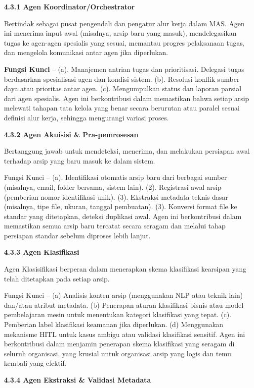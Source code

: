 \textbf{4.3.1 Agen Koordinator/Orchestrator}

Bertindak sebagai pusat pengendali dan pengatur alur kerja dalam MAS.
Agen ini menerima input awal (misalnya, arsip baru yang masuk),
mendelegasikan tugas ke agen-agen spesialis yang sesuai, memantau
progres pelaksanaan tugas, dan mengelola komunikasi antar agen jika
diperlukan.

\textbf{Fungsi Kunci} -- (a). Manajemen antrian tugas dan prioritisasi.
Delegasi tugas berdasarkan spesialisasi agen dan kondisi sistem. (b).
Resolusi konflik sumber daya atau prioritas antar agen. (c).
Mengumpulkan status dan laporan parsial dari agen spesialis. Agen ini
berkontribusi dalam memastikan bahwa setiap arsip melewati tahapan tata
kelola yang benar secara berurutan atau paralel sesuai definisi alur
kerja, sehingga mengurangi variasi proses.

\textbf{4.3.2 Agen Akuisisi \& Pra-pemrosesan}

Bertanggung jawab untuk mendeteksi, menerima, dan melakukan persiapan
awal terhadap arsip yang baru masuk ke dalam sistem.

Fungsi Kunci -- (a). Identifikasi otomatis arsip baru dari berbagai
sumber (misalnya, email, folder bersama, sistem lain). (2). Registrasi
awal arsip (pemberian nomor identifikasi unik). (3). Ekstraksi metadata
teknis dasar (misalnya, tipe file, ukuran, tanggal pembuatan). (3).
Konversi format file ke standar yang ditetapkan, deteksi duplikasi awal.
Agen ini berkontribusi dalam memastikan semua arsip baru tercatat secara
seragam dan melalui tahap persiapan standar sebelum diproses lebih
lanjut.

\textbf{4.3.3 Agen Klasifikasi}

Agen Klasisifikasi berperan dalam menerapkan skema klasifikasi kearsipan
yang telah ditetapkan pada setiap arsip.

Fungsi Kunci -- (a) Analisis konten arsip (menggunakan NLP atau teknik
lain) dan/atau atribut metadata. (b) Penerapan aturan klasifikasi bisnis
atau model pembelajaran mesin untuk menentukan kategori klasifikasi yang
tepat. (c). Pemberian label klasifikasi keamanan jika diperlukan. (d)
Menggunakan mekanisme HITL untuk kasus ambigu atau validasi klasifikasi
sensitif. Agen ini berkontribusi dalam menjamin penerapan skema
klasifikasi yang seragam di seluruh organisasi, yang krusial untuk
organisasi arsip yang logis dan temu kembali yang efektif.

\textbf{4.3.4 Agen Ekstraksi \& Validasi Metadata}


